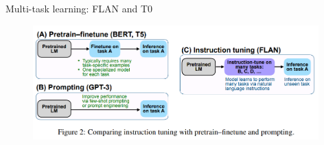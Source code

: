 %
%
%
%
%

%
%
%
%
%


\begin{frame}{Multi-task learning: FLAN and T0}

\vfill
	
	\begin{figure}
		\centering
		\includegraphics[width = 11cm]{figure/81-flan.png}\\ 
	\end{figure}

\vfill

\end{frame}


